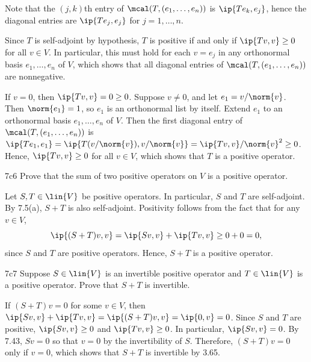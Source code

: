 \begin{sol}
    Note that the $(j, k)$th entry of $\mcal(T, (e_1, \ldots, e_n))$ is $\ip{T e_k, e_j}$, hence the diagonal entries are $\ip{T e_j, e_j}$ for $j = 1, \ldots, n$.

    \rightimp Since $T$ is self-adjoint by hypothesis, $T$ is positive if and only if $\ip{T v, v} \geq 0$ for all $v \in V$.
    In particular, this must hold for each $v = e_j$ in any orthonormal basis $e_1, \ldots, e_n$ of $V$, which shows that all diagonal entries of $\mcal(T, (e_1, \ldots, e_n))$ are nonnegative.

    \leftimp If $v = 0$, then $\ip{T v, v} = 0 \geq 0$.
    Suppose $v \neq 0$, and let $e_1 = v / \norm{v}$.
    Then $\norm{e_1} = 1$, so $e_1$ is an orthonormal list by itself.
    Extend $e_1$ to an orthonormal basis $e_1, \ldots, e_n$ of $V$.
    Then the first diagonal entry of $\mcal(T, (e_1, \ldots, e_n))$ is $\ip{T e_1, e_1} = \ip{T (v / \norm{v}), v / \norm{v}} = \ip{T v, v} / \norm{v}^2 \geq 0$.
    Hence, $\ip{T v, v} \geq 0$ for all $v \in V$, which shows that $T$ is a positive operator.
\end{sol}

\begin{exercise}{7c6}
    Prove that the sum of two positive operators on $V$ is a positive operator.
\end{exercise}

\begin{sol}
    Let $S, T \in \lin{V}$ be positive operators.
    In particular, $S$ and $T$ are self-adjoint.
    By 7.5(a), $S + T$ is also self-adjoint.
    Positivity follows from the fact that for any $v \in V$,
    \[
        \ip{(S + T)v, v} = \ip{Sv, v} + \ip{Tv, v} \geq 0 + 0 = 0,
    \]
    since $S$ and $T$ are positive operators.
    Hence, $S + T$ is a positive operator.
\end{sol}

\begin{exercise}{7c7}
    Suppose $S \in \lin{V}$ is an invertible positive operator and $T \in \lin{V}$ is a positive operator.
    Prove that $S + T$ is invertible.
\end{exercise}

\begin{sol}
    If $(S + T)v = 0$ for some $v \in V$, then $\ip{Sv, v} + \ip{Tv, v} = \ip{(S + T)v, v} = \ip{0, v} = 0$.
    Since $S$ and $T$ are positive, $\ip{Sv, v} \geq 0$ and $\ip{Tv, v} \geq 0$.
    In particular, $\ip{Sv, v} = 0$.
    By 7.43, $Sv = 0$ so that $v = 0$ by the invertibility of $S$.
    Therefore, $(S + T)v = 0$ only if $v = 0$, which shows that $S + T$ is invertible by 3.65.
\end{sol}

